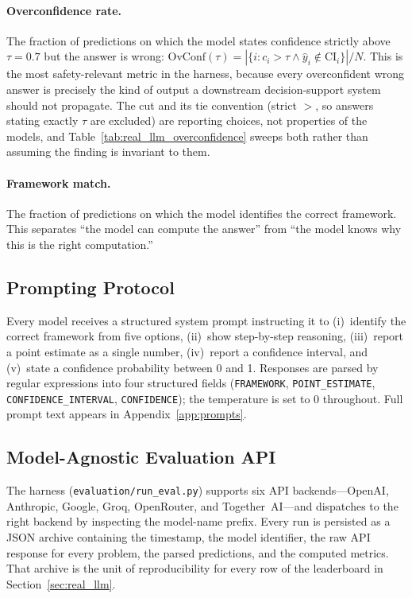 \documentclass{article}
\newcommand{\ci}{\mathrm{CI}}
\begin{document}
\paragraph{Overconfidence rate.} The fraction of predictions on which the model states confidence strictly above $\tau = 0.7$ but the answer is wrong:
$\text{OvConf}(\tau) = |\{i : c_i > \tau \wedge \hat{y}_i \notin \ci_i\}| / N$.
This is the most safety-relevant metric in the harness, because every overconfident wrong answer is precisely the kind of output a downstream decision-support system should not propagate. The cut and its tie convention (strict $>$, so answers stating exactly $\tau$ are excluded) are reporting choices, not properties of the models, and Table~\ref{tab:real_llm_overconfidence} sweeps both rather than assuming the finding is invariant to them.

\paragraph{Framework match.} The fraction of predictions on which the model identifies the correct framework. This separates ``the model can compute the answer'' from ``the model knows why this is the right computation.''

\subsection{Prompting Protocol}
\label{sec:prompting}

Every model receives a structured system prompt instructing it to (i)~identify the correct framework from five options, (ii)~show step-by-step reasoning, (iii)~report a point estimate as a single number, (iv)~report a confidence interval, and (v)~state a confidence probability between 0 and 1. Responses are parsed by regular expressions into four structured fields (\texttt{FRAMEWORK}, \texttt{POINT\_ESTIMATE}, \texttt{CONFIDENCE\_INTERVAL}, \texttt{CONFIDENCE}); the temperature is set to 0 throughout. Full prompt text appears in Appendix~\ref{app:prompts}.

\subsection{Model-Agnostic Evaluation API}

The harness (\texttt{evaluation/run\_eval.py}) supports six API backends---OpenAI, Anthropic, Google, Groq, OpenRouter, and Together~AI---and dispatches to the right backend by inspecting the model-name prefix. Every run is persisted as a JSON archive containing the timestamp, the model identifier, the raw API response for every problem, the parsed predictions, and the computed metrics. That archive is the unit of reproducibility for every row of the leaderboard in Section~\ref{sec:real_llm}.
\end{document}
